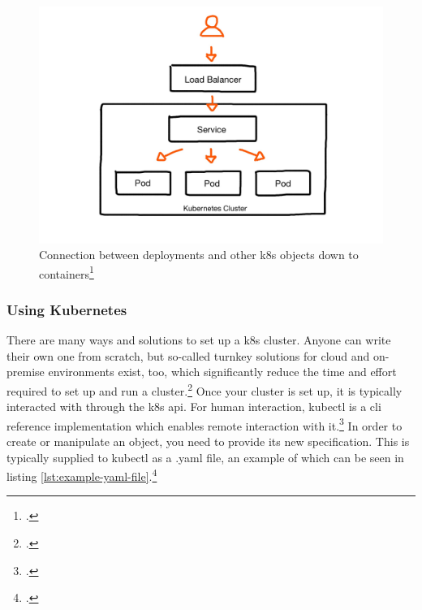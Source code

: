\begin{figure}
\includegraphics[scale=0.2]{pictures/loadbalancer.JPG} 
\caption{Connection between deployments and other \gls{k8s} objects down to containers\protect\footcite{nicoPictures}}
\label{fig:loadbalancer}
\end{figure}


\subsubsection{Using Kubernetes}
There are many ways and solutions to set up a \gls{k8s} cluster. Anyone can write their own one from scratch, but so-called turnkey solutions for cloud and on-premise environments exist, too, which significantly reduce the time and effort required to set up and run a cluster.\footcite[][, sections 'Turnkey Cloud Solutions' and 'On-Premises turnkey cloud solutions']{turnkey}
Once your cluster is set up, it is typically interacted with through the \gls{k8s} \gls{api}. For human interaction, kubectl is a \gls{cli} reference implementation which enables remote interaction with it.\footcite[][, section 'The Kubernetes API']{k8sApi}
In order to create or manipulate an object, you need to provide its new specification. This is typically supplied to kubectl as a .yaml file, an example of which can be seen in listing \ref{lst:example-yaml-file}.\footcite[][, section 'Describing a Kubernetes Object']{k8sObjects}

